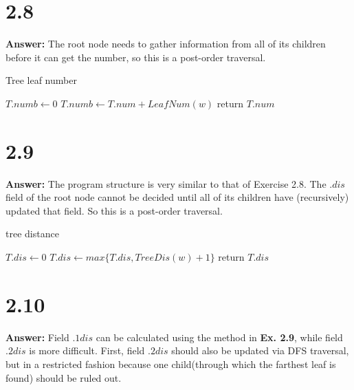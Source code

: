 \documentclass[a4paper,11pt]{article}
\theoremstyle{mytheor}
\begin{document}
\vspace{1.2in}

\section*{2.8}
\noindent\textbf{Answer:} The root node needs to gather information from all of its children before it can get the number, so this is a post-order traversal.

\begin{algorithm}[H]
\caption{Tree leaf number}\label{sec:TREEEVALUATION_2_8}
\begin{algorithmic}[1]
  \State $T.numb \gets 0$
   
    \State $T.numb \gets T.num + LeafNum(w)$
  \EndFor
  \State return $T.num$
\EndFunction
\end{algorithmic}
\end{algorithm}

\vspace{1.2in}

\section*{2.9}
\noindent\textbf{Answer:} The program structure is very similar to that of Exercise 2.8. The $.dis$ field of the root node cannot be decided until all of its children have (recursively) updated that field. So this is a post-order traversal.

\begin{algorithm}[H]
\caption{tree distance}\label{sec:TREEEVALUATION_2_9}
\begin{algorithmic}[1]
  \State $T.dis \gets 0$
    \State $T.dis \gets max\{ T.dis, TreeDis(w) + 1\}$
  \EndFor
  \State return $T.dis$
\EndFunction
\end{algorithmic}
\end{algorithm}

\vspace{1.2in}

\section*{2.10}
\noindent\textbf{Answer:} Field $.1dis$ can be calculated using the method in \textbf{Ex. 2.9}, while field $.2dis$ is more difficult. First, field $.2dis$ should also be updated via DFS traversal, but in a restricted fashion because one child(through which the farthest leaf is found) should be ruled out.
\end{document}

